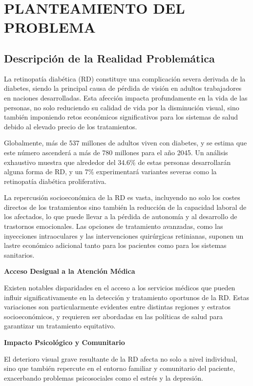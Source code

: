 \chapter{PLANTEAMIENTO DEL PROBLEMA}
\section{Descripción de la Realidad Problemática}

La retinopatía diabética (RD) constituye una complicación severa derivada de la diabetes, siendo la principal causa de pérdida de visión en adultos trabajadores en naciones desarrolladas. Esta afección impacta profundamente en la vida de las personas, no solo reduciendo su calidad de vida por la disminución visual, sino también imponiendo retos económicos significativos para los sistemas de salud debido al elevado precio de los tratamientos.

Globalmente, más de 537 millones de adultos viven con diabetes, y se estima que este número ascenderá a más de 780 millones para el año 2045. Un análisis exhaustivo muestra que alrededor del 34.6\% de estas personas desarrollarán alguna forma de RD, y un 7\% experimentará variantes severas como la retinopatía diabética proliferativa.

La repercusión socioeconómica de la RD es vasta, incluyendo no solo los costes directos de los tratamientos sino también la reducción de la capacidad laboral de los afectados, lo que puede llevar a la pérdida de autonomía y al desarrollo de trastornos emocionales. Las opciones de tratamiento avanzadas, como las inyecciones intraoculares y las intervenciones quirúrgicas retinianas, suponen un lastre económico adicional tanto para los pacientes como para los sistemas sanitarios.

\textbf{Acceso Desigual a la Atención Médica}

Existen notables disparidades en el acceso a los servicios médicos que pueden influir significativamente en la detección y tratamiento oportunos de la RD. Estas variaciones son particularmente evidentes entre distintas regiones y estratos socioeconómicos, y requieren ser abordadas en las políticas de salud para garantizar un tratamiento equitativo.

\textbf{Impacto Psicológico y Comunitario}

El deterioro visual grave resultante de la RD afecta no solo a nivel individual, sino que también repercute en el entorno familiar y comunitario del paciente, exacerbando problemas psicosociales como el estrés y la depresión.


